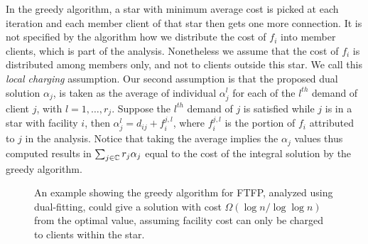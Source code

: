 \documentclass[oneside,final]{ucr}
\begin{document}
In the greedy algorithm, a star with minimum average cost is
picked at each iteration and each member client of that star
then gets one more connection. It is not specified by the
algorithm how we distribute the cost of $f_i$ into member
clients, which is part of the analysis. Nonetheless we
assume that the cost of $f_i$ is distributed among members
only, and not to clients outside this star. We call this
\emph{local charging} assumption. Our second assumption is
that the proposed dual solution $\alpha_j$, is taken as the
average of individual $\alpha_j^l$ for each of the $l^{th}$
demand of client $j$, with $l=1,\ldots,r_j$. Suppose the
$l^{th}$ demand of $j$ is satisfied while $j$ is in a star
with facility $i$, then $\alpha_j^l = d_{ij} + f_i^{j,l}$,
where $f_i^{j,l}$ is the portion of $f_i$ attributed to $j$
in the analysis. Notice that taking the average implies the
$\alpha_j$ values thus computed results in
$\sum_{j\in\mathbb{C}} r_j \alpha_j$ equal to the cost of
the integral solution by the greedy algorithm.

\begin{figure}
  \centering
  \caption{An example showing the greedy algorithm for FTFP,
    analyzed using dual-fitting, could give a solution with
    cost $\Omega(\log n / \log\log n)$ from the optimal
    value, assuming facility cost can only be charged to
    clients within the star.}
  \label{fig:greedy_lower_bound}
\end{figure}
\end{document}
